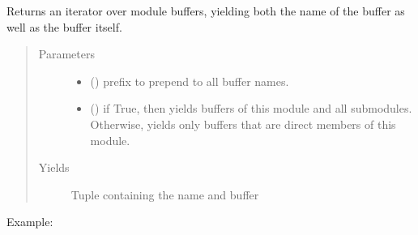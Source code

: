 \documentclass[letterpaper,10pt,english]{sphinxmanual}
\begin{document}
\begin{fulllineitems}
\begin{fulllineitems}
\begin{sphinxVerbatim}[commandchars=\\\{\}]
\end{sphinxVerbatim}

\end{fulllineitems}


\begin{fulllineitems}
\label{\detokenize{api/autoencoding:geology.metamodelling.SpatialAutoencoder.named_buffers}}
Returns an iterator over module buffers, yielding both the
name of the buffer as well as the buffer itself.
\begin{quote}\begin{description}
\item[{Parameters}] \leavevmode\begin{itemize}
\item {} 
 () \textendash{} prefix to prepend to all buffer names.

\item {} 
 () \textendash{} if True, then yields buffers of this module
and all submodules. Otherwise, yields only buffers that
are direct members of this module.

\end{itemize}

\item[{Yields}] \leavevmode
{} \textendash{} Tuple containing the name and buffer

\end{description}\end{quote}

Example:


\end{fulllineitems}
\end{fulllineitems}
\end{document}
